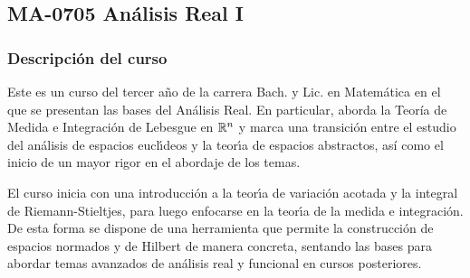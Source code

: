 \newpage
\subsection*{MA-0705 Análisis Real I}

\hypertarget{MA0705}{}
\begin{refsection}
\begin{table}[H]
\end{table}



\subsubsection*{Descripción del curso}

Este es un curso del tercer año de la carrera Bach. y Lic. en Matemática en el que se presentan las bases del Análisis Real. En particular, aborda la Teoría de Medida e Integración de Lebesgue en $\mathbb{R}^n$ y marca una transici\'{o}n entre el estudio del an\'{a}lisis de espacios eucl\'{\i}deos y la teor\'{\i}a de espacios abstractos, así como el inicio de un mayor rigor en el abordaje de los temas. 

El curso inicia con una introducci\'{o}n a la teor\'{\i}a de variación acotada y la integral de Riemann-Stieltjes, para luego enfocarse en la teor\'{\i}a de la medida e integraci\'{o}n. De esta forma se
dispone de una herramienta que permite la construcci\'{o}n de espacios normados y de Hilbert de manera concreta, sentando las bases para abordar temas avanzados de an\'{a}lisis real y funcional en cursos posteriores.


\end{refsection}

